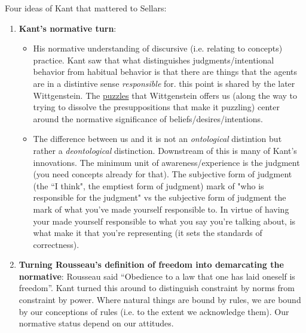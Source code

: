 \documentclass[12pt,a4paper]{report}
\begin{document}
Four ideas of Kant that mattered to Sellars:
\begin{enumerate}
\item \textbf{Kant's normative turn}:
\begin{itemize}
\item His normative understanding of discursive (i.e. relating to concepts) practice. Kant saw that what distinguishes judgments/intentional behavior from habitual behavior is that there are things that the agents are in a distintive sense \emph{responsible} for. this point is shared by the later Wittgenstein. The \href{doc/phil/Phil Situations/Childrens Game.html}{puzzles} that Wittgenstein offers us (along the way to trying to dissolve the presuppositions that make it puzzling) center around the normative significance of beliefs/desires/intentions.

\item The difference between us and it is not an \emph{ontological} distintion but rather a \emph{deontological} distinction. Downstream of this is many of Kant's innovations. The minimum unit of awareness/experience is the judgment (you need concepts already for that). The subjective form of judgment (the ``I think", the emptiest form of judgment) mark of "who is responsible for the judgment" vs the subjective form of judgment the mark of what you've made yourself responsible to. In virtue of having your made yourself responsible to what you say you're talking about, is what make it that you're representing (it sets the standards of correctness).
\end{itemize}

\item \textbf{Turning Rousseau's definition of freedom into demarcating the normative}: Rousseau said ``Obedience to a law that one has laid oneself is freedom''. Kant turned this around to distinguish constraint by norms from constraint by power. Where natural things are bound by rules, we are bound by our conceptions of rules (i.e. to the extent we acknowledge them). Our normative status depend on our attitudes.


\end{enumerate}
\end{document}
